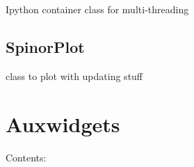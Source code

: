 \documentclass[letterpaper,10pt,english]{sphinxmanual}
\begin{document}
\begin{fulllineitems}
\label{QIPythonWidgetContainer:Ipython.QIPythonWidgetContainer}
Ipython container class for multi-threading

\end{fulllineitems}



\section{SpinorPlot}
\label{SpinorPlot:spinorplot}\label{SpinorPlot::doc}

\begin{fulllineitems}
\label{SpinorPlot:Ipython.SpinorPlot}
class to plot with updating stuff

\begin{fulllineitems}
\label{SpinorPlot:Ipython.SpinorPlot.get_vars}
\end{fulllineitems}


\begin{fulllineitems}
\label{SpinorPlot:Ipython.SpinorPlot.set_axis}
\end{fulllineitems}


\begin{fulllineitems}
\label{SpinorPlot:Ipython.SpinorPlot.update_plot}
\end{fulllineitems}


\end{fulllineitems}



\chapter{Auxwidgets}
\label{Auxwidgets::doc}\label{Auxwidgets:auxwidgets}
Contents:
\end{document}
